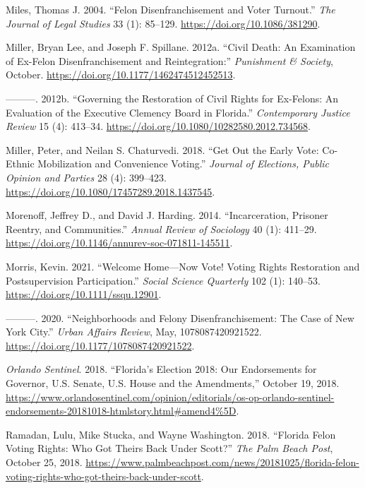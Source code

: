 \documentclass[
  12pt,
]{article}
\newlength{\cslhangindent}
\newenvironment{cslreferences}%
  {\setlength{\parindent}{0pt}%
  \everypar{\setlength{\hangindent}{\cslhangindent}}\ignorespaces}%
  {\par}
\begin{document}
\begin{cslreferences}
\leavevmode\hypertarget{ref-Miles2004}{}%
Miles, Thomas J. 2004. ``Felon Disenfranchisement and Voter Turnout.'' \emph{The Journal of Legal Studies} 33 (1): 85--129. \url{https://doi.org/10.1086/381290}.

\leavevmode\hypertarget{ref-Miller2012}{}%
Miller, Bryan Lee, and Joseph F. Spillane. 2012a. ``Civil Death: An Examination of Ex-Felon Disenfranchisement and Reintegration:'' \emph{Punishment \& Society}, October. \url{https://doi.org/10.1177/1462474512452513}.

\leavevmode\hypertarget{ref-Miller2012a}{}%
---------. 2012b. ``Governing the Restoration of Civil Rights for Ex-Felons: An Evaluation of the Executive Clemency Board in Florida.'' \emph{Contemporary Justice Review} 15 (4): 413--34. \url{https://doi.org/10.1080/10282580.2012.734568}.

\leavevmode\hypertarget{ref-Miller2018}{}%
Miller, Peter, and Neilan S. Chaturvedi. 2018. ``Get Out the Early Vote: Co-Ethnic Mobilization and Convenience Voting.'' \emph{Journal of Elections, Public Opinion and Parties} 28 (4): 399--423. \url{https://doi.org/10.1080/17457289.2018.1437545}.

\leavevmode\hypertarget{ref-Morenoff2014}{}%
Morenoff, Jeffrey D., and David J. Harding. 2014. ``Incarceration, Prisoner Reentry, and Communities.'' \emph{Annual Review of Sociology} 40 (1): 411--29. \url{https://doi.org/10.1146/annurev-soc-071811-145511}.

\leavevmode\hypertarget{ref-Morris2021}{}%
Morris, Kevin. 2021. ``Welcome Home---Now Vote! Voting Rights Restoration and Postsupervision Participation.'' \emph{Social Science Quarterly} 102 (1): 140--53. \url{https://doi.org/10.1111/ssqu.12901}.

\leavevmode\hypertarget{ref-Morris2020}{}%
---------. 2020. ``Neighborhoods and Felony Disenfranchisement: The Case of New York City.'' \emph{Urban Affairs Review}, May, 1078087420921522. \url{https://doi.org/10.1177/1078087420921522}.

\leavevmode\hypertarget{ref-ORLANDOSENTINEL2018}{}%
\emph{Orlando Sentinel}. 2018. ``Florida's Election 2018: Our Endorsements for Governor, U.S. Senate, U.S. House and the Amendments,'' October 19, 2018. \url{https://www.orlandosentinel.com/opinion/editorials/os-op-orlando-sentinel-endorsements-20181018-htmlstory.html\#amend4\%5D}.

\leavevmode\hypertarget{ref-Ramadan2018}{}%
Ramadan, Lulu, Mike Stucka, and Wayne Washington. 2018. ``Florida Felon Voting Rights: Who Got Theirs Back Under Scott?'' \emph{The Palm Beach Post}, October 25, 2018. \url{https://www.palmbeachpost.com/news/20181025/florida-felon-voting-rights-who-got-theirs-back-under-scott}.


\end{cslreferences}
\end{document}
